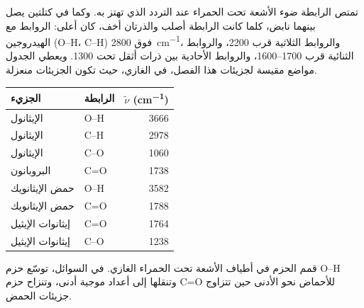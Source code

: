 تمتص الرابطة ضوء الأشعة تحت الحمراء عند التردد الذي تهتز به.
وكما في كتلتين يصل بينهما نابض، كلما كانت الرابطة أصلب
والذرتان أخف، كان  أعلى: الروابط مع الهيدروجين (O--H، C--H)
فوق \qty{2800}{cm^{-1}}، والروابط الثلاثية قرب 2200، والروابط الثنائية قرب
1700--1600، والروابط الأحادية بين ذرات أثقل تحت 1300. ويعطي الجدول
مواضع مقيسة لجزيئات هذا الفصل، في  الغازي،
حيث تكون الجزيئات منعزلة.

\begin{omfigure}
\begin{tabular}{llr}
\hline
الجزيء & الرابطة & $\tilde\nu$ (\unit{cm^{-1}}) \\
\hline
الإيثانول & O--H & 3666 \\
الإيثانول & C--H & 2978 \\
الإيثانول & C--O & 1060 \\
البروبانون & C=O & 1738 \\
حمض الإيثانويك & O--H & 3582 \\
حمض الإيثانويك & C=O & 1788 \\
إيثانوات الإيثيل & C=O & 1764 \\
إيثانوات الإيثيل & C--O & 1238 \\
\hline
\end{tabular}

\smallskip
{\small قمم الحزم في أطياف الأشعة تحت الحمراء  الغازي. في السوائل، توسّع  حزم O--H وتنقلها إلى أعداد موجية أدنى،
وتنزاح حزم C=O للأحماض نحو الأدنى حين تتزاوج جزيئات الحمض.}
\end{omfigure}

